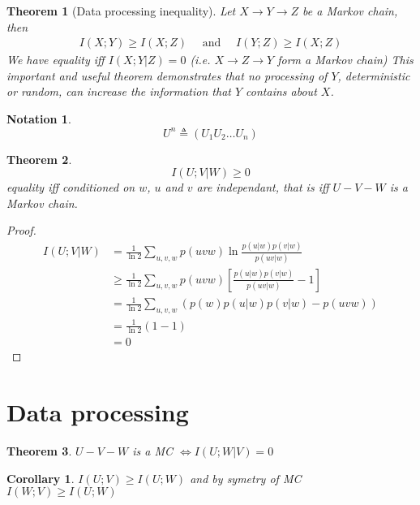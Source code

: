 \documentclass[twoside]{article}
\newtheorem{theorem}{Theorem}[section]
\newtheorem{corollary}{Corollary}[theorem]
\newtheorem{notation}{Notation}
\theoremstyle{definition} %
\begin{document}
\begin{theorem}[Data processing inequality]
  Let $X \rightarrow Y \rightarrow Z$ be a Markov chain, then
  \begin{align*}
    I(X ; Y) \geq I(X ; Z) \quad \text{ and } \quad I(Y ; Z) \geq I(X ; Z)
  \end{align*}
  We have equality iff $I(X ; Y | Z) = 0$ (i.e. $X \rightarrow Z \rightarrow Y$ form a Markov chain)
  This important and useful theorem demonstrates that no processing of $Y$, deterministic or random, can increase the information that $Y$ contains about $X$.
\end{theorem}

\begin{notation}
  \[
    U^n \triangleq (U_1 U_2 \dots U_n)
  \]
\end{notation}

\begin{theorem}
  \[
    I(U;V |W) \geq 0
  \]
  equality iff conditioned on $w$, $u$ and $v$ are independant, that is iff $U-V-W$ is a Markov chain.
\end{theorem}


\begin{proof}
  \begin{align*}
    I(U;V|W) &= \frac 1 {\ln 2} \sum_{u,v,w} p(uvw) \ln \frac {p(u|w)p(v|w)} {p(uv | w)}\\
    &\geq \frac 1 {\ln 2} \sum_{u,v,w} p(uvw) \left[ \frac {p(u|w)p(v|w)} {p(uv | w)} - 1 \right]\\
    &=\frac 1 {\ln 2} \sum_{u,v,w}(p(w)p(u|w)p(v|w) - p(uvw))\\
    &= \frac 1 {\ln 2}(1 - 1) \\
    &=0
  \end{align*}
\end{proof}


\cleardoublepage
\section{Data processing}

\begin{theorem}
  $U-V-W$ is a MC $\iff I(U;W|V) = 0$
\end{theorem}

\begin{corollary}
  $I(U;V) \geq I(U;W)$ and by symetry of MC $I(W;V) \geq I(U;W)$
\end{corollary}
\end{document}
